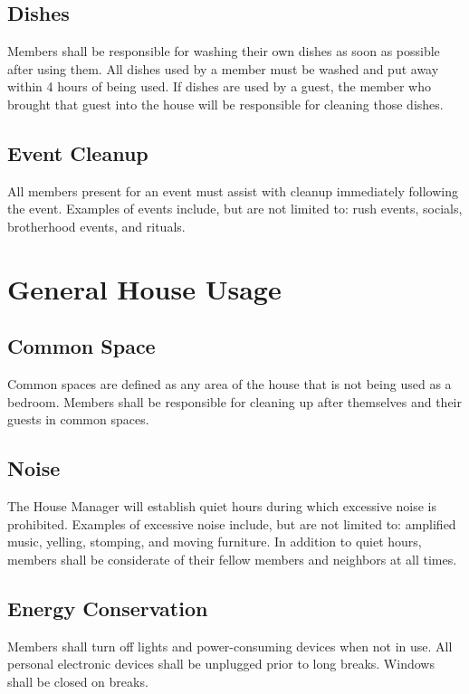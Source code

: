 \subsection{Dishes}

Members shall be responsible for washing their own dishes as soon as possible
after using them.
All dishes used by a member must be washed and put away within 4 hours of being
used.
If dishes are used by a guest, the member who brought that guest into the house
will be responsible for cleaning those dishes.

\subsection{Event Cleanup}
\label{sec:event-cleanup}

All members present for an event must assist with cleanup immediately following
the event.
Examples of events include, but are not limited to: rush events, socials,
brotherhood events, and rituals.


\section{General House Usage}

\subsection{Common Space}

Common spaces are defined as any area of the house that is not being used as a
bedroom.
Members shall be responsible for cleaning up after themselves and their guests
in common spaces.

\subsection{Noise}

The House Manager will establish quiet hours during which excessive noise is
prohibited.
Examples of excessive noise include, but are not limited to: amplified music,
yelling, stomping, and moving furniture.
In addition to quiet hours, members shall be considerate of their fellow
members and neighbors at all times.


\subsection{Energy Conservation}

Members shall turn off lights and power-consuming devices when not in use.
All personal electronic devices shall be unplugged prior to long breaks.
Windows shall be closed on breaks.

